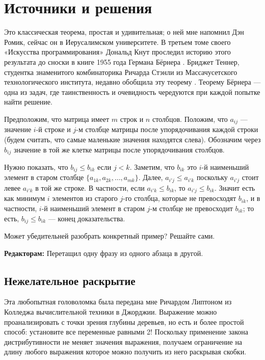 \section*{Источники и решения}

Это классическая теорема, простая и удивительная; о ней мне напомнил Дэн Ромик, сейчас он в Иерусалимском университете.
В третьем томе своего «Искусства программирования» \cite{knut} Дональд Кнут проследил историю этого результата до сноски в книге 1955 года Германа Бёрнера \cite{boerner}.
Бриджет Теннер, студентка знаменитого комбинаторика Ричарда Стэнли из Массачусетского технологического института, недавно обобщила эту теорему \cite{tenner}.
Теорему Бёрнера --- одна из задач, где таинственность и очевидность чередуются при каждой попытке найти решение.

Предположим, что матрица имеет $m$ строк и $n$ столбцов.
Положим, что $a_{ij}$ --- значение $i$-й строке и $j$-м столбце матрицы
после упорядочивания каждой строки (будем считать, что самые маленькие значения находятся слева).
Обозначим через $b_{ij}$ значение в той же клетке матрицы после упорядочивания столбцов.

Нужно показать, что $b_{ij} \le b_{ik}$ если $j < k$.
Заметим, что $b_{ik}$ это $i$-й наименьший элемент в старом столбце $\{a_{1k}, a_{2k}, \dots, a_{mk}\}$.
Далее, $a_{i'j}\le a_{i'k}$ поскольку $a_{i'j}$ стоит левее $a_{i'k}$ в той же строке.
В частности, если $a_{i'k}\le b_{ik}$, то $a_{i'j}\le b_{ik}$.
Значит есть как минимум $i$ элементов из старого $j$-го столбца, которые не превосходят $b_{ik}$,
и в частности, $i$-й наименьший элемент в старом $j$-м столбце не превосходит $b_{ik}$;
то есть, $b_{ij} \le b_{ik}$ --- конец доказательства.

Может убедительней разобрать конкретный пример?
Решайте сами.


\begin{addedbytheeditors}
\textbf{Редакторам:} Перетащил одну фразу из одного абзаца в другой.
\end{addedbytheeditors}

\subsection*{Нежелательное раскрытие}

Эта любопытная головоломка была передана мне Ричардом Липтоном из Колледжа вычислительной техники в Джорджии.
Выражение можно проанализировать с точки зрения глубины деревьев, но есть и более простой способ:
установите все переменные равными 2!
Поскольку применение закона дистрибутивности не меняет значения выражения,
получаем ограничение на длину любого выражения которое можно получить из него раскрывая скобки.

